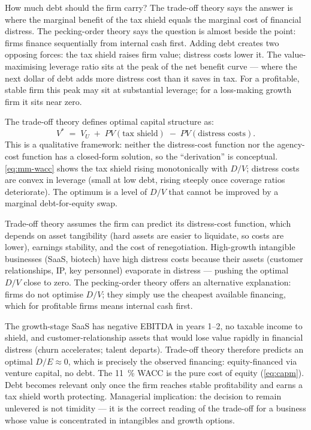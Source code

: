 How much debt should the firm carry? The trade-off theory says the answer is where the
marginal benefit of the tax shield equals the marginal cost of financial distress. The
pecking-order theory says the question is almost beside the point: firms finance
sequentially from internal cash first. Adding debt creates two opposing forces: the tax
shield raises firm value; distress costs lower it. The value-maximising leverage ratio sits
at the peak of the net benefit curve --- where the next dollar of debt adds more distress
cost than it saves in tax. For a profitable, stable firm this peak may sit at substantial
leverage; for a loss-making growth firm it sits near zero.

The trade-off theory defines optimal capital structure as:
\[
  V^* \;=\; V_U \;+\; PV(\text{tax shield}) \;-\; PV(\text{distress costs}).
\]
This is a qualitative framework: neither the distress-cost function nor the agency-cost
function has a closed-form solution, so the ``derivation'' is conceptual. \cref{eq:mm-wacc}
shows the tax shield rising monotonically with \(D/V\); distress costs are convex in
leverage (small at low debt, rising steeply once coverage ratios deteriorate). The optimum
is a level of \(D/V\) that cannot be improved by a marginal debt-for-equity swap.

Trade-off theory assumes the firm can predict its distress-cost function, which depends on
asset tangibility (hard assets are easier to liquidate, so costs are lower), earnings
stability, and the cost of renegotiation. High-growth intangible businesses (SaaS, biotech)
have high distress costs because their assets (customer relationships, IP, key personnel)
evaporate in distress --- pushing the optimal \(D/V\) close to zero. The pecking-order
theory offers an alternative explanation: firms do not optimise \(D/V\); they simply use
the cheapest available financing, which for profitable firms means internal cash first.

\begin{example}
The growth-stage SaaS has negative EBITDA in years 1--2, no taxable income to shield, and
customer-relationship assets that would lose value rapidly in financial distress (churn
accelerates; talent departs). Trade-off theory therefore predicts an optimal
\(D/E\approx0\), which is precisely the observed financing: equity-financed via venture
capital, no debt. The \qty{11}{\percent} WACC is the pure cost of equity (\cref{eq:capm}).
Debt becomes relevant only once the firm reaches stable profitability and earns a tax shield
worth protecting. Managerial implication: the decision to remain unlevered is not timidity
--- it is the correct reading of the trade-off for a business whose value is concentrated
in intangibles and growth options.
\end{example}

